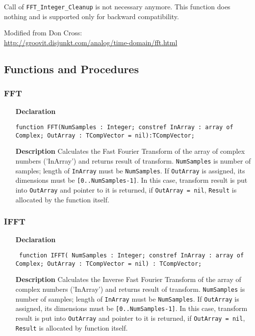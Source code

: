 \documentclass[12pt,a4paper,oneside]{report}
\newcommand{\declarationitem}[1]{\textbf{#1}}
\newcommand{\descriptiontitle}[1]{\textbf{#1}}
\newcommand{\code}[1]{\texttt{#1}}
\begin{document}
Call of \code{FFT{\_}Integer{\_}Cleanup} is not necessary anymore. This function does nothing and is supported only for backward compatibility.

Modified from Don Cross:\\ \href{http://groovit.disjunkt.com/analog/time-domain/fft.html}{http://groovit.disjunkt.com/analog/time-domain/fft.html}

\subsection{Functions and Procedures}
\subsubsection{FFT}
\label{ufft-FFT}
\begin{itemize}\item[\declarationitem{Declaration}\hfill]
	\begin{flushleft}
		\code{function FFT(NumSamples : Integer; constref InArray : array of Complex; OutArray : TCompVector = nil):TCompVector;}
		\end{flushleft}
	\par
	\item[\descriptiontitle{Description}]
	Calculates the Fast Fourier Transform of the array of complex numbers ('InArray') and returns result of transform.  \code{NumSamples} is number of samples; length of \code{InArray} must be \code{NumSamples}. 
	If \code{OutArray} is assigned, its dimensions must be \code{[0..NumSamples-1]}. In this case, transform result is put into \code{OutArray} and pointer to it is returned, if \code{OutArray = nil}, \code{Result} is allocated by the function itself.
\end{itemize}
\subsubsection{IFFT}
\label{ufft-IFFT}
\begin{itemize}
	\item[\declarationitem{Declaration}\hfill]
	\begin{flushleft}
		\code{
			function IFFT(       NumSamples : Integer;
			constref InArray : array of Complex; 
			OutArray : TCompVector = nil) : TCompVector;}
	\end{flushleft}
	\item[\descriptiontitle{Description}]
	Calculates the Inverse Fast Fourier Transform of the array of complex numbers ('InArray') and returns result of transform.  \code{NumSamples} is number of samples; length of \code{InArray} must be \code{NumSamples}. 
    If \code{OutArray} is assigned, its dimensions must be \code{[0..NumSamples-1]}. In this case, transform result is put into \code{OutArray} and pointer to it is returned, if \code{OutArray = nil}, \code{Result} is allocated by function itself.
\end{itemize}
\end{document}
